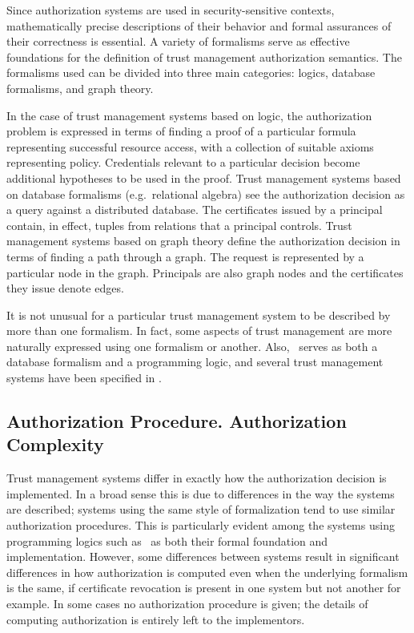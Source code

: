 Since authorization systems are used in security-sensitive contexts, mathematically precise
descriptions of their behavior and formal assurances of their correctness is essential. A
variety of formalisms serve as effective foundations for the definition of trust management
authorization semantics. The formalisms used can be divided into three main categories: logics,
database formalisms, and graph theory.

In the case of trust management systems based on logic, the authorization problem is expressed
in terms of finding a proof of a particular formula representing successful resource access,
with a collection of suitable axioms representing policy. Credentials relevant to a particular
decision become additional hypotheses to be used in the proof. Trust management systems based on
database formalisms (e.g.~relational algebra) see the authorization decision as a query against
a distributed database. The certificates issued by a principal contain, in effect, tuples from
relations that a principal controls. Trust management systems based on graph theory define the
authorization decision in terms of finding a path through a graph. The request is represented by
a particular node in the graph. Principals are also graph nodes and the certificates they issue
denote edges.

It is not unusual for a particular trust management system to be described by more than one
formalism. In fact, some aspects of trust management are more naturally expressed using one
formalism or another. Also, \datalog\ serves as both a database formalism and a programming
logic, and several trust management systems have been specified in \datalog.

\subsection{Authorization Procedure. Authorization Complexity}

Trust management systems differ in exactly how the authorization decision is implemented. In a
broad sense this is due to differences in the way the systems are described; systems using the
same style of formalization tend to use similar authorization procedures. This is particularly
evident among the systems using programming logics such as \datalog\ as both their formal
foundation and implementation. However, some differences between systems result in significant
differences in how authorization is computed even when the underlying formalism is the same, if
certificate revocation is present in one system but not another for example. In some cases no
authorization procedure is given; the details of computing authorization is entirely left to the
implementors.


